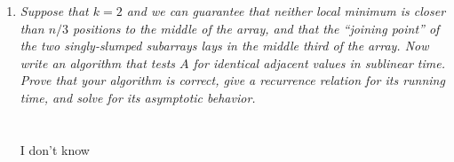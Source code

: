 \documentclass[12pt]{article}
\begin{document}
\begin{enumerate}
\begin{enumerate}
\pagebreak
\item \label{3d} {\itshape Suppose that $k=2$ and we can guarantee that neither
local minimum is closer than $n/3$ positions to the middle of the array, and
that the ``joining point'' of the two singly-slumped subarrays lays in the
middle third of the array.  Now write an algorithm that tests $A$ for
identical adjacent values in sublinear time. Prove that your algorithm is
correct, give a recurrence relation for its running time, and solve for
its asymptotic behavior.}
\\ \\ \\ I don't know
\end{enumerate}
	
\end{enumerate}
\end{document}
